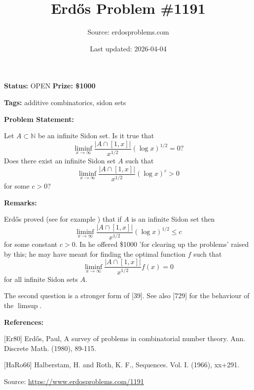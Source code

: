 \documentclass{article}
\title{Erd\H{o}s Problem \#1191}
\date{Last updated: 2026-04-04}
\author{Source: erdosproblems.com}
\begin{document}
\maketitle

\noindent\textbf{Status:} OPEN \quad \textbf{Prize: \$1000}

\noindent\textbf{Tags:} additive combinatorics, sidon sets

\medskip
\noindent\textbf{Problem Statement:}

Let $A\subset\mathbb{N}$ be an infinite Sidon set. Is it true that\[\liminf_{x\to \infty} \frac{\lvert A\cap [1,x]\rvert}{x^{1/2}}(\log x)^{1/2}=0?\]Does there exist an infinite Sidon set $A$ such that\[\liminf_{x\to \infty} \frac{\lvert A\cap [1,x]\rvert}{x^{1/2}}(\log x)^c>0\]for some $c>0$?

\bigskip
\noindent\textbf{Remarks:}

Erd\H{o}s proved (see for example \cite{HaRo66}) that if $A$ is an infinite Sidon set then\[\liminf_{x\to \infty} \frac{\lvert A\cap [1,x]\rvert}{x^{1/2}}(\log x)^{1/2}\leq c\]for some constant $c>0$. In \cite{Er80} he offered \$1000 'for clearing up the problems' raised by this; he may have meant for finding the optimal function $f$ such that\[\liminf_{x\to \infty} \frac{\lvert A\cap [1,x]\rvert}{x^{1/2}}f(x)=0\]for all infinite Sidon sets $A$.

The second question is a stronger form of [39]. See also [729] for the behaviour of the $\limsup$.

\bigskip
\noindent\textbf{References:}

[Er80] Erd\H{o}s, Paul, A survey of problems in combinatorial number theory. Ann. Discrete Math. (1980), 89-115.
 
 [HaRo66] Halberstam, H. and Roth, K. F., Sequences. {V}ol. I. (1966), xx+291.

\bigskip
\noindent\small{Source: \url{https://www.erdosproblems.com/1191}}
\end{document}
